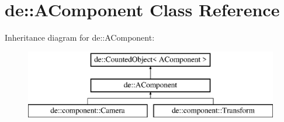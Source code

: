 \hypertarget{classde_1_1_a_component}{
\section{de\-:\-:\-A\-Component \-Class \-Reference}
\label{classde_1_1_a_component}
}
\-Inheritance diagram for de\-:\-:\-A\-Component\-:\begin{figure}[H]
\begin{center}
\leavevmode
\includegraphics[height=3.000000cm]{classde_1_1_a_component}
\end{center}
\end{figure}
